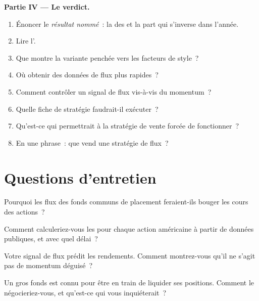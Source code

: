 \begin{problem}
\medskip\noindent\textbf{Partie IV --- Le verdict.}
\begin{enumerate}[resume]
\item Énoncer le \emph{résultat nommé}~: la  des  et la part qui s'inverse dans l'année.
\item Lire l'.
\item Que montre la variante penchée vers les facteurs de style~?
\item Où obtenir des données de flux plus rapides~?
\item Comment contrôler un signal de flux vis-à-vis du momentum~?
\item Quelle fiche de stratégie faudrait-il exécuter~?
\item Qu'est-ce qui permettrait à la stratégie de vente forcée de fonctionner~?
\item En une phrase~: que vend une stratégie de flux~?
\end{enumerate}
\end{problem}

\section{Questions d'entretien}

\begin{interviewq}\label{iq:s1:flows:1}
Pourquoi les flux des fonds communs de placement feraient-ils bouger les cours des actions~?
\end{interviewq}

\begin{interviewq}\label{iq:s1:flows:2}
Comment calculeriez-vous les  pour chaque action américaine à partir de données publiques, et avec quel délai~?
\end{interviewq}

\begin{interviewq}\label{iq:s1:flows:3}
Votre signal de flux prédit les rendements. Comment montrez-vous qu'il ne s'agit pas de momentum déguisé~?
\end{interviewq}

\begin{interviewq}\label{iq:s1:flows:4}
Un gros fonds est connu pour être en train de liquider ses positions. Comment le négocieriez-vous, et qu'est-ce qui vous inquiéterait~?
\end{interviewq}

